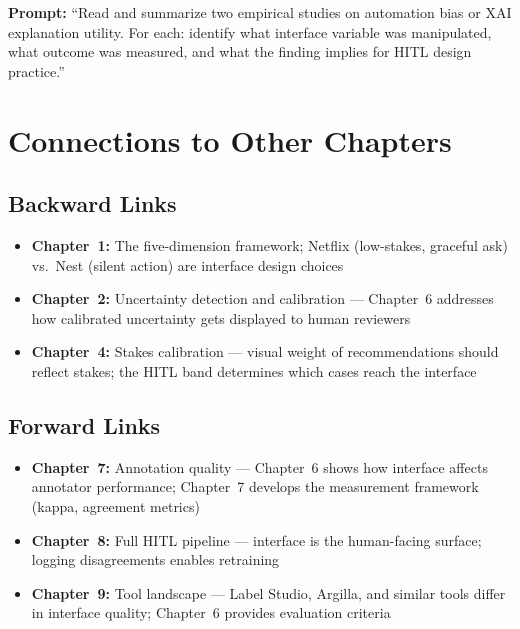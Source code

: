 \textbf{Prompt:} ``Read and summarize two empirical studies on automation bias or XAI explanation utility. For each: identify what interface variable was manipulated, what outcome was measured, and what the finding implies for HITL design practice.''

\section{Connections to Other Chapters}

\subsection{Backward Links}
\begin{itemize}
    \item \textbf{Chapter~1:} The five-dimension framework; Netflix (low-stakes, graceful ask) vs.\ Nest (silent action) are interface design choices
    \item \textbf{Chapter~2:} Uncertainty detection and calibration --- Chapter~6 addresses how calibrated uncertainty gets displayed to human reviewers
    \item \textbf{Chapter~4:} Stakes calibration --- visual weight of recommendations should reflect stakes; the HITL band determines which cases reach the interface
\end{itemize}

\subsection{Forward Links}
\begin{itemize}
    \item \textbf{Chapter~7:} Annotation quality --- Chapter~6 shows how interface affects annotator performance; Chapter~7 develops the measurement framework (kappa, agreement metrics)
    \item \textbf{Chapter~8:} Full HITL pipeline --- interface is the human-facing surface; logging disagreements enables retraining
    \item \textbf{Chapter~9:} Tool landscape --- Label Studio, Argilla, and similar tools differ in interface quality; Chapter~6 provides evaluation criteria
\end{itemize}

